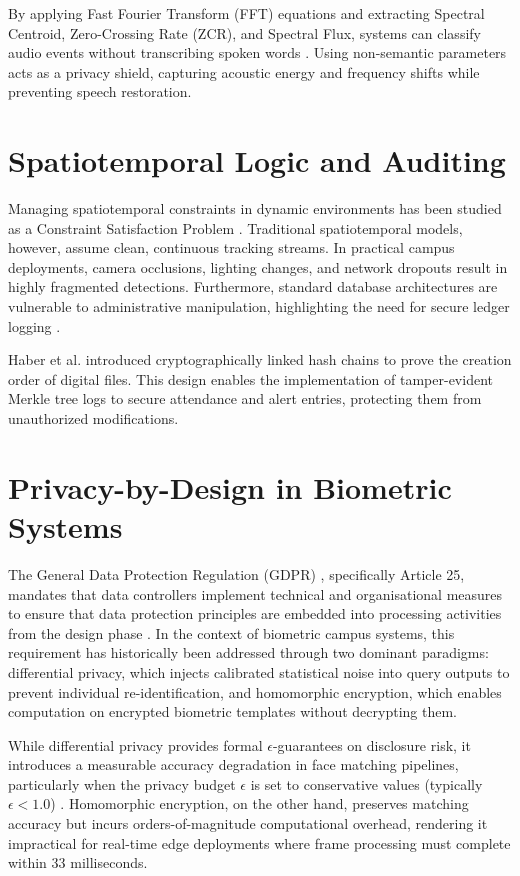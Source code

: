 \documentclass[12pt,a4paper,oneside]{report}
\begin{document}
By applying Fast Fourier Transform (FFT) equations and extracting Spectral Centroid, Zero-Crossing Rate (ZCR), and Spectral Flux, systems can classify audio events without transcribing spoken words \cite{ryoo2017privacy}. Using non-semantic parameters acts as a privacy shield, capturing acoustic energy and frequency shifts while preventing speech restoration.

\section{Spatiotemporal Logic and Auditing}
Managing spatiotemporal constraints in dynamic environments has been studied as a Constraint Satisfaction Problem \cite{spatiotemporal2018}. Traditional spatiotemporal models, however, assume clean, continuous tracking streams. In practical campus deployments, camera occlusions, lighting changes, and network dropouts result in highly fragmented detections. Furthermore, standard database architectures are vulnerable to administrative manipulation, highlighting the need for secure ledger logging \cite{chow2005shredding}.

Haber et al. \cite{haber1991proving} introduced cryptographically linked hash chains to prove the creation order of digital files. This design enables the implementation of tamper-evident Merkle tree logs to secure attendance and alert entries, protecting them from unauthorized modifications.

\section{Privacy-by-Design in Biometric Systems}
The General Data Protection Regulation (GDPR) \cite{gdpr2016}, specifically Article 25, mandates that data controllers implement technical and organisational measures to ensure that data protection principles are embedded into processing activities from the design phase \cite{voigt2017gdpr}. In the context of biometric campus systems, this requirement has historically been addressed through two dominant paradigms: differential privacy, which injects calibrated statistical noise into query outputs to prevent individual re-identification, and homomorphic encryption, which enables computation on encrypted biometric templates without decrypting them.

While differential privacy provides formal $\epsilon$-guarantees on disclosure risk, it introduces a measurable accuracy degradation in face matching pipelines, particularly when the privacy budget $\epsilon$ is set to conservative values (typically $\epsilon < 1.0$) \cite{dwork2006dp, abadi2016dpdl}. Homomorphic encryption, on the other hand, preserves matching accuracy but incurs orders-of-magnitude computational overhead, rendering it impractical for real-time edge deployments where frame processing must complete within 33 milliseconds.
\end{document}

